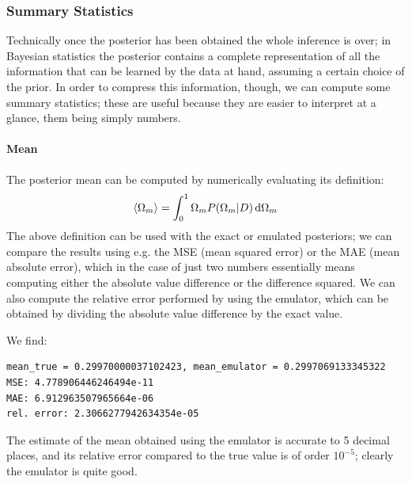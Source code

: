 \subsubsection{Summary Statistics}
Technically once the posterior has been obtained the whole inference is over; in Bayesian statistics the posterior contains a complete representation of all the information that can be learned by the data at hand, assuming a certain choice of the prior. In order to compress this information, though, we can compute some summary statistics; these are useful because they are easier to interpret at a glance, them being simply numbers.

\paragraph{Mean}
The posterior mean can be computed by numerically evaluating its definition:
\begin{equation*}
    \expval{\Omega_m} = \int_0^1 \Omega_m P(\Omega_m|D) \dd{\Omega_m}
\end{equation*}
The above definition can be used with the exact or emulated posteriors; we can compare the results using e.g. the MSE (mean squared error) or the MAE (mean absolute error), which in the case of just two numbers essentially means computing either the absolute value difference or the difference squared. We can also compute the relative error performed by using the emulator, which can be obtained by dividing the absolute value difference by the exact value.

We find:
\begin{verbatim}
mean_true = 0.29970000037102423, mean_emulator = 0.2997069133345322
MSE: 4.778906446246494e-11
MAE: 6.912963507965664e-06
rel. error: 2.3066277942634354e-05
\end{verbatim}

The estimate of the mean obtained using the emulator is accurate to 5 decimal places, and its relative error compared to the true value is of order $10^{-5}$; clearly the emulator is quite good.

